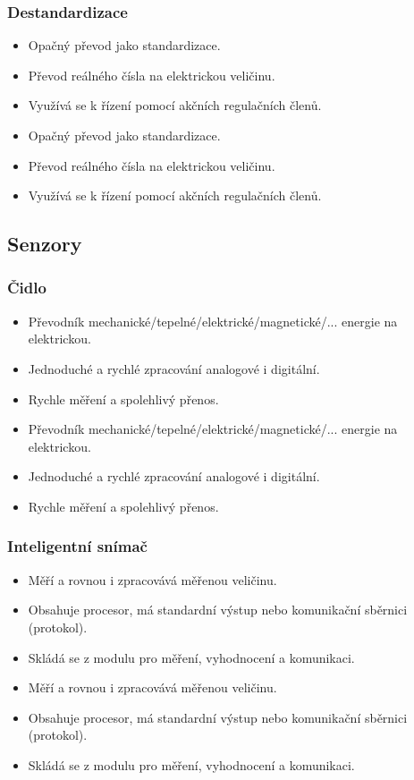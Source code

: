 \subsubsection*{Destandardizace}
\begin{itemize}
  \item Opačný převod jako standardizace. 
  \item Převod reálného čísla na elektrickou veličinu.
  \item Využívá se k řízení pomocí akčních regulačních členů.
    \item Opačný převod jako standardizace.
    \item Převod reálného čísla na elektrickou veličinu.
    \item Využívá se k řízení pomocí akčních regulačních členů.
\end{itemize}

\subsection{Senzory}

\subsubsection*{Čidlo}
\begin{itemize}
  \item Převodník mechanické/tepelné/elektrické/magnetické/... energie na elektrickou.
  \item Jednoduché a rychlé zpracování analogové i digitální.
  \item Rychle měření a spolehlivý přenos.
    \item Převodník mechanické/tepelné/elektrické/magnetické/... energie na elektrickou.
    \item Jednoduché a rychlé zpracování analogové i digitální.
    \item Rychle měření a spolehlivý přenos.
\end{itemize}

\subsubsection*{Inteligentní snímač}
\begin{itemize}
  \item Měří a rovnou i zpracovává měřenou veličinu.
  \item Obsahuje procesor, má standardní výstup nebo komunikační sběrnici (protokol).
  \item Skládá se z modulu pro měření, vyhodnocení a komunikaci.
    \item Měří a rovnou i zpracovává měřenou veličinu.
    \item Obsahuje procesor, má standardní výstup nebo komunikační sběrnici (protokol).
    \item Skládá se z modulu pro měření, vyhodnocení a komunikaci.
\end{itemize}

